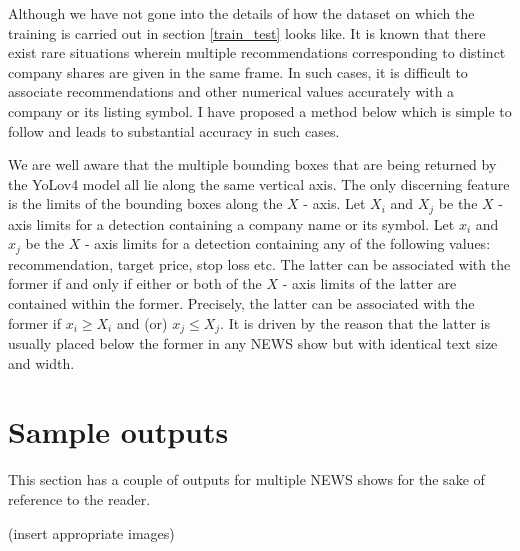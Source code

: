 Although we have not gone into the details of how the dataset on which the training is carried out in section \ref{train_test} looks like. It is known that there exist rare situations wherein multiple recommendations corresponding to distinct company shares are given in the same frame. In such cases, it is difficult to associate recommendations and other numerical values accurately with a company or its listing symbol. I have proposed a method below which is simple to follow and leads to substantial accuracy in such cases. \par

We are well aware that the multiple bounding boxes that are being returned by the YoLov4 model all lie along the same vertical axis. The only discerning feature is the limits of the bounding boxes along the $X$ - axis. Let $X_i$ and $X_j$ be the $X$ - axis limits for a detection containing a company name or its symbol. Let $x_i$ and $x_j$ be the $X$ - axis limits for a detection containing any of the following values: recommendation, target price, stop loss etc. The latter can be associated with the former if and only if either or both of the $X$ - axis limits of the latter are contained within the former. Precisely, the latter can be associated with the former if $x_{i} \geqslant X_{i}$ and (or)  $x_{j} \leqslant X_{j}$. It is driven by the reason that the latter is usually placed below the former in any NEWS show but with identical text size and width.

\section{Sample outputs}

This section has a couple of outputs for multiple NEWS shows for the sake of reference to the reader.

(insert appropriate images)
